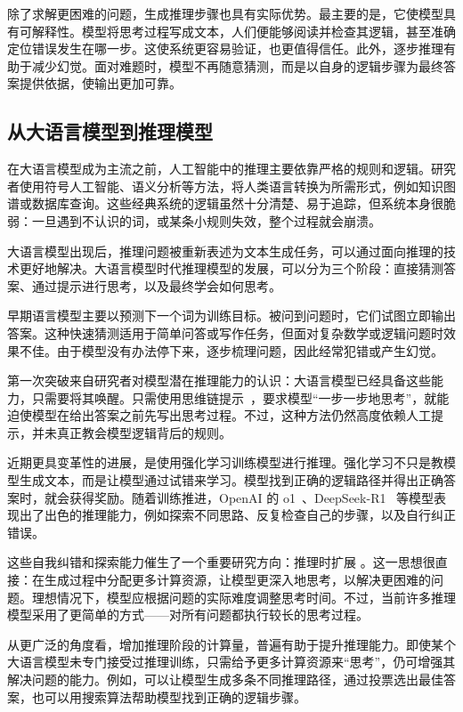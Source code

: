 除了求解更困难的问题，生成推理步骤也具有实际优势。最主要的是，它使模型具有可解释性。模型将思考过程写成文本，人们便能够阅读并检查其逻辑，甚至准确定位错误发生在哪一步。这使系统更容易验证，也更值得信任。此外，逐步推理有助于减少幻觉。面对难题时，模型不再随意猜测，而是以自身的逻辑步骤为最终答案提供依据，使输出更加可靠。

\subsection{从大语言模型到推理模型}

在大语言模型成为主流之前，人工智能中的推理主要依靠严格的规则和逻辑。研究者使用符号人工智能、语义分析等方法，将人类语言转换为所需形式，例如知识图谱或数据库查询。这些经典系统的逻辑虽然十分清楚、易于追踪，但系统本身很脆弱：一旦遇到不认识的词，或某条小规则失效，整个过程就会崩溃。

大语言模型出现后，推理问题被重新表述为文本生成任务，可以通过面向推理的技术更好地解决。大语言模型时代推理模型的发展，可以分为三个阶段：直接猜测答案、通过提示进行思考，以及最终学会如何思考。

早期语言模型主要以预测下一个词为训练目标。被问到问题时，它们试图立即输出答案。这种快速猜测适用于简单问答或写作任务，但面对复杂数学或逻辑问题时效果不佳。由于模型没有办法停下来，逐步梳理问题，因此经常犯错或产生幻觉。

第一次突破来自研究者对模型潜在推理能力的认识：大语言模型已经具备这些能力，只需要将其唤醒。只需使用思维链提示~\cite{wei-etal:2022chain}，要求模型“一步一步地思考”，就能迫使模型在给出答案之前先写出思考过程。不过，这种方法仍然高度依赖人工提示，并未真正教会模型逻辑背后的规则。

近期更具变革性的进展，是使用强化学习训练模型进行推理。强化学习不只是教模型生成文本，而是让模型通过试错来学习。模型找到正确的逻辑路径并得出正确答案时，就会获得奖励。随着训练推进，OpenAI 的 o1~\cite{openai:2024learning}、DeepSeek-R1~\cite{deepseek:2025r1} 等模型表现出了出色的推理能力，例如探索不同思路、反复检查自己的步骤，以及自行纠正错误。

这些自我纠错和探索能力催生了一个重要研究方向：推理时扩展 \cite{snell-etal:2024scaling}。这一思想很直接：在生成过程中分配更多计算资源，让模型更深入地思考，以解决更困难的问题。理想情况下，模型应根据问题的实际难度调整思考时间。不过，当前许多推理模型采用了更简单的方式——对所有问题都执行较长的思考过程。

从更广泛的角度看，增加推理阶段的计算量，普遍有助于提升推理能力。即使某个大语言模型未专门接受过推理训练，只需给予更多计算资源来“思考”，仍可增强其解决问题的能力。例如，可以让模型生成多条不同推理路径，通过投票选出最佳答案，也可以用搜索算法帮助模型找到正确的逻辑步骤。

